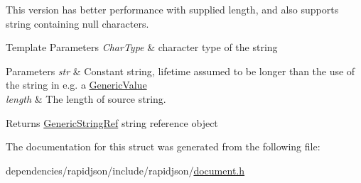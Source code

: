 This version has better performance with supplied length, and also supports string containing null characters.


\begin{DoxyTemplParams}{Template Parameters}
{\em Char\+Type} & character type of the string \\
\hline
\end{DoxyTemplParams}

\begin{DoxyParams}{Parameters}
{\em str} & Constant string, lifetime assumed to be longer than the use of the string in e.\+g. a \hyperlink{class_generic_value}{Generic\+Value} \\
\hline
{\em length} & The length of source string. \\
\hline
\end{DoxyParams}
\begin{DoxyReturn}{Returns}
\hyperlink{struct_generic_string_ref}{Generic\+String\+Ref} string reference object 
\end{DoxyReturn}


The documentation for this struct was generated from the following file\+:\begin{DoxyCompactItemize}
\item 
dependencies/rapidjson/include/rapidjson/\hyperlink{document_8h}{document.\+h}\end{DoxyCompactItemize}
